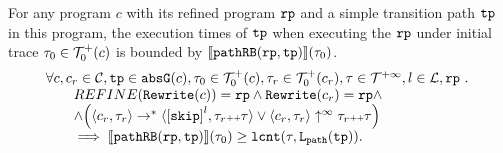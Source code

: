 \begin{lemma}
  For any program $c$ with its refined program $\mathtt{rp}$ and a simple transition path $\mathtt{tp}$ in this program,
  the execution times of $\mathtt{tp}$ when executing the $\mathtt{rp}$ under initial trace $\mathtt{\tau}_0 \in \mathcal{T}^{+}_0(c)$ is bounded by $\llbracket \mathtt{pathRB}(\mathtt{rp}, \mathtt{tp}) \rrbracket(\mathtt{\tau}_0)$.
  \[
    \begin{array}{l}
      \forall c, c_r \in \cdom, \tpath \in \absG(c), \trace_0 \in \ftdom_0(c),  \trace_r \in \ftdom_0(c_r), \trace \in \tdom, l \in \ldom, \rprog \sthat 
      \\ \qquad
      REFINE(\algrewrite(c)) = \rprog
      \land 
      \algrewrite(c_r) = \rprog
      \land
      \\ \qquad
      \land 
      \Big(
        \config{c_r, \trace_r} \rightarrow^* \config{\clabel{\eskip}^{l}, \trace_r \tracecat \trace}
        \lor \config{c_r, \trace_r} \uparrow^{\infty} \trace_r \tracecat \trace 
        \Big)
    \\ \qquad
    \implies
    \econfig{\inoutB(\rprog, \tpath)}(\trace_0) \geq \lcounter(\trace, \pathl(\tpath)).
    \end{array}
  \]
\end{lemma}
%
